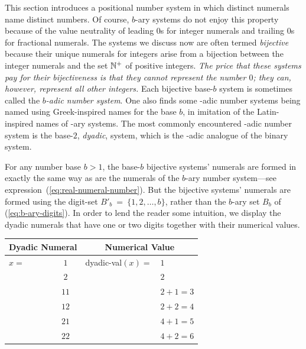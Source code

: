 This section introduces a positional number system in which distinct numerals name distinct numbers.  Of course, $b$-ary systems do not enjoy this property because of the value neutrality of leading $0$s for integer numerals and trailing $0$s for fractional numerals.  The systems we discuss now are often termed {\it bijective} because their unique numerals for integers arise from a bijection between the integer numerals and the set $\mathbb{N}^+$ of positive integers.  {\em The price that these systems pay for their bijectiveness is that they cannot represent the number $0$; they can, however, represent all other integers.}  Each bijective base-$b$ system is sometimes called the {\it $b$-adic number system}.  One also finds some -adic number systems being named using Greek-inspired names for the base $b$, in imitation of the Latin-inspired names of -ary
systems.  The most commonly encountered -adic number system is the base-$2$, {\it dyadic},
system, which is the -adic analogue of the binary system.

\medskip

For any number base $b > 1$, the base-$b$ bijective systems' numerals are formed in exactly the same way as are the numerals of the $b$-ary number system---see expression~(\ref{eq:real-numeral-number}).  But the bijective systems' numerals are formed using the digit-set $B'_b \ = \ \{1, 2, \ldots, b\}$, rather than the $b$-ary set $B_b$ of (\ref{eq:b-ary-digits}).  In order to lend the reader some intuition, we display the dyadic numerals that have one or two digits together with their numerical values.

\medskip

\begin{tabular}{|lc|ll|}
\multicolumn{2}{c}{\bf Dyadic Numeral} & \multicolumn{2}{c}{\bf Numerical Value} \\
\hline
$x=$ & $1$  & {\sc dyadic-val}$(x) =$ & $1$ \\
     & $2$  &                         & $2$ \\
     & $11$ &                         & $2 + 1 = 3$ \\
     & $12$ &                         & $2 + 2 = 4$ \\
     & $21$ &                         & $4 + 1 = 5$ \\
     & $22$ &                         & $4 + 2 = 6$ \\
\hline
\end{tabular}

